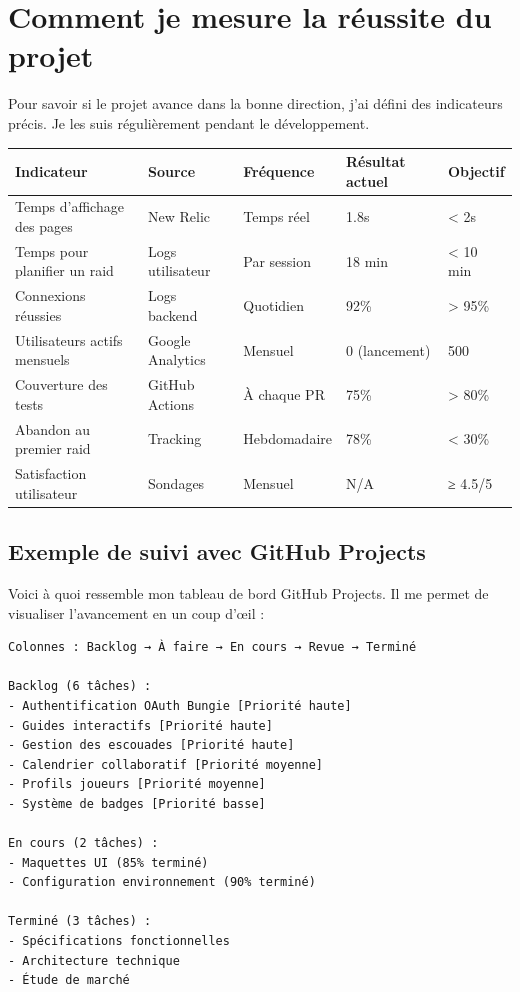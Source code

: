 \section{Comment je mesure la réussite du projet}

Pour savoir si le projet avance dans la bonne direction, j'ai défini des indicateurs précis. Je les suis régulièrement pendant le développement.

\begin{center}
\begin{tabular}{|p{3cm}|p{2.5cm}|p{2cm}|p{2cm}|p{2cm}|}
\hline
\textbf{Indicateur} & \textbf{Source} & \textbf{Fréquence} & \textbf{Résultat actuel} & \textbf{Objectif} \\
\hline
Temps d'affichage des pages & New Relic & Temps réel & 1.8s & < 2s \\
\hline
Temps pour planifier un raid & Logs utilisateur & Par session & 18 min & < 10 min \\
\hline
Connexions réussies & Logs backend & Quotidien & 92\% & > 95\% \\
\hline
Utilisateurs actifs mensuels & Google Analytics & Mensuel & 0 (lancement) & 500 \\
\hline
Couverture des tests & GitHub Actions & À chaque PR & 75\% & > 80\% \\
\hline
Abandon au premier raid & Tracking & Hebdomadaire & 78\% & < 30\% \\
\hline
Satisfaction utilisateur & Sondages & Mensuel & N/A & ≥ 4.5/5 \\
\hline
\end{tabular}
\end{center}

\subsection*{Exemple de suivi avec GitHub Projects}

Voici à quoi ressemble mon tableau de bord GitHub Projects. Il me permet de visualiser l'avancement en un coup d'œil :

\begin{verbatim}
Colonnes : Backlog → À faire → En cours → Revue → Terminé

Backlog (6 tâches) :
- Authentification OAuth Bungie [Priorité haute]
- Guides interactifs [Priorité haute]  
- Gestion des escouades [Priorité haute]
- Calendrier collaboratif [Priorité moyenne]
- Profils joueurs [Priorité moyenne]
- Système de badges [Priorité basse]

En cours (2 tâches) :
- Maquettes UI (85% terminé)
- Configuration environnement (90% terminé)

Terminé (3 tâches) :
- Spécifications fonctionnelles
- Architecture technique
- Étude de marché
\end{verbatim}

